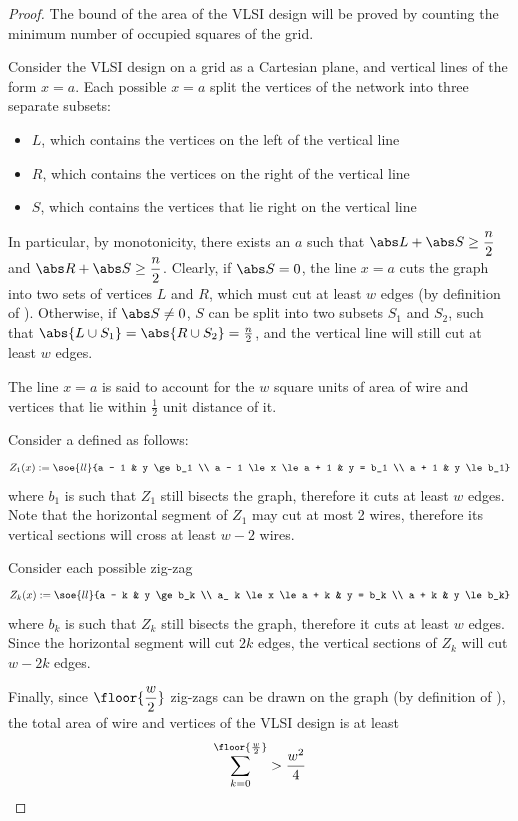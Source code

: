 \documentclass[a4paper, 12pt]{report}
\begin{document}
    \begin{proof}
        The bound of the area of the VLSI design will be proved by counting the minimum number of occupied squares of the grid.

        Consider the VLSI design on a grid as a Cartesian plane, and vertical lines of the form $x = a$. Each possible $x = a$ split the vertices of the network into three separate subsets:

        \begin{itemize}
            \item $L$, which contains the vertices on the left of the vertical line
            \item $R$, which contains the vertices on the right of the vertical line
            \item $S$, which contains the vertices that lie right on the vertical line
        \end{itemize}

        In particular, by monotonicity, there exists an $a$ such that $\abs L + \abs S \ge \dfrac{n}{2}$ and $\abs R + \abs S \ge \dfrac{n}{2}$. Clearly, if $\abs S = 0$, the line $x = a$ cuts the graph into two sets of vertices $L$ and $R$, which must cut at least $w$ edges (by definition of ). Otherwise, if $\abs S \neq 0$, $S$ can be split into two subsets $S_1$ and $S_2$, such that $\abs {L \cup S_1} = \abs{R \cup S_2} = \frac{n}{2}$, and the vertical line will still cut at least $w$ edges.

        The line $x = a$ is said to account for the $w$ square units of area of wire and vertices that lie within $\frac{1}{2}$ unit distance of it.

        Consider a  defined as follows: $$Z_1(x) := \soe{ll}{a - 1 & y \ge b_1 \\ a - 1 \le x \le a + 1 & y = b_1 \\ a + 1 & y \le b_1}$$ where $b_1$ is such that $Z_1$ still bisects the graph, therefore it cuts at least $w$ edges. Note that the horizontal segment of $Z_1$ may cut at most 2 wires, therefore its vertical sections will cross at least $w - 2$ wires.

        Consider each possible zig-zag $$Z_k(x) := \soe{ll}{a - k & y \ge b_k \\ a_ k \le x \le a + k & y = b_k \\ a + k & y \le b_k}$$ where $b_k$ is such that $Z_k$ still bisects the graph, therefore it cuts at least $w$ edges. Since the horizontal segment will cut $2k$ edges, the vertical sections of $Z_k$ will cut $w - 2k$ edges.

        Finally, since $\floor{\dfrac{w}{2}}$ zig-zags can be drawn on the graph (by definition of ), the total area of wire and vertices of the VLSI design is at least $$\sum_{k = 0}^{\floor{\frac{w}{2}}} > \dfrac{w^2}{4}$$
    \end{proof}
\end{document}
